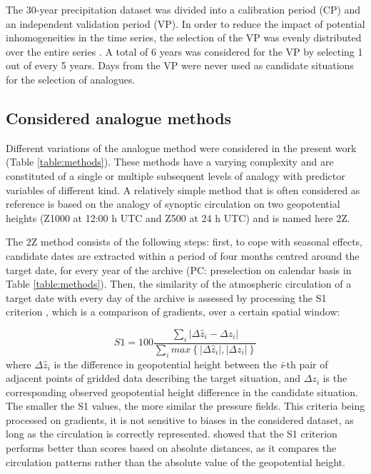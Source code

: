 \documentclass{ametsoc}
\begin{document}
The 30-year precipitation dataset was divided into a calibration period (CP) and an independent validation period (VP). In order to reduce the impact of potential inhomogeneities in the time series, the selection of the VP was evenly distributed over the entire series \citep{BenDaoud2010}. A total of 6 years was considered for the VP by selecting 1 out of every 5 years. Days from the VP were never used as candidate situations for the selection of analogues.


\subsection{Considered analogue methods}
\label{sec:ams}

Different variations of the analogue method were considered in the present work (Table \ref{table:methods}). These methods have a varying complexity and are constituted of a single or multiple subsequent levels of analogy with predictor variables of different kind. A relatively simple method that is often considered as reference is based on the analogy of synoptic circulation on two geopotential heights (Z1000 at 12:00 h UTC and Z500 at 24 h UTC) and is named here 2Z.

The 2Z method consists of the following steps: first, to cope with seasonal effects, candidate dates are extracted within a period of four months centred around the target date, for every year of the archive (PC: preselection on calendar basis in Table \ref{table:methods}). Then, the similarity of the atmospheric circulation of a target date with every day of the archive is assessed by processing the S1 criterion \citep[Eq.\ \ref{eq:S1}, ][]{Teweles1954, Drosdowsky2003}, which is a comparison of gradients, over a certain spatial window:

\begin{equation}
\label{eq:S1}
S1=100 \frac {\displaystyle \sum_{i} \vert \Delta\hat{z}_{i} - \Delta z_{i} \vert}
{\displaystyle \sum_{i} max\left\lbrace \vert \Delta\hat{z}_{i} \vert , \vert \Delta z_{i} \vert \right\rbrace }
\end{equation}
where $\Delta \hat{z}_{i}$ is the difference in geopotential height between the \textit{i}-th pair of adjacent points of gridded data describing the target situation, and $\Delta z_{i}$ is the corresponding observed geopotential height difference in the candidate situation. The smaller the S1 values, the more similar the pressure fields. This criteria being processed on gradients, it is not sensitive to biases in the considered dataset, as long as the circulation is correctly represented. \citet{Bontron2004} showed that the S1 criterion performs better than scores based on absolute distances, as it compares the circulation patterns rather than the absolute value of the geopotential height. 
\end{document}
